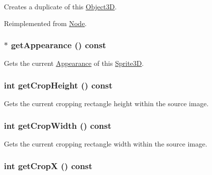 Creates a duplicate of this \hyperlink{classm3g_1_1Object3D}{Object3D}. 

Reimplemented from \hyperlink{classm3g_1_1Node_0b9f7531a4b56d34f47aeb1fff0d37e0}{Node}.\hypertarget{classm3g_1_1Sprite3D_0219cb20ddea978a5796b5b414d012d2}{
\subsubsection[{getAppearance}]{ $\ast$ getAppearance () const}}
\label{classm3g_1_1Sprite3D_0219cb20ddea978a5796b5b414d012d2}


Gets the current \hyperlink{classm3g_1_1Appearance}{Appearance} of this \hyperlink{classm3g_1_1Sprite3D}{Sprite3D}. \hypertarget{classm3g_1_1Sprite3D_d6d9d6f23b7bb004c93642bcd081f4a3}{
\subsubsection[{getCropHeight}]{\setlength{\rightskip}{0pt plus 5cm}int getCropHeight () const}}
\label{classm3g_1_1Sprite3D_d6d9d6f23b7bb004c93642bcd081f4a3}


Gets the current cropping rectangle height within the source image. \hypertarget{classm3g_1_1Sprite3D_5c6515f6706675ef31ca5dfa0a03b953}{
\subsubsection[{getCropWidth}]{\setlength{\rightskip}{0pt plus 5cm}int getCropWidth () const}}
\label{classm3g_1_1Sprite3D_5c6515f6706675ef31ca5dfa0a03b953}


Gets the current cropping rectangle width within the source image. \hypertarget{classm3g_1_1Sprite3D_d0ba0211183decc8f0459ca598b12912}{
\subsubsection[{getCropX}]{\setlength{\rightskip}{0pt plus 5cm}int getCropX () const}}
\label{classm3g_1_1Sprite3D_d0ba0211183decc8f0459ca598b12912}


